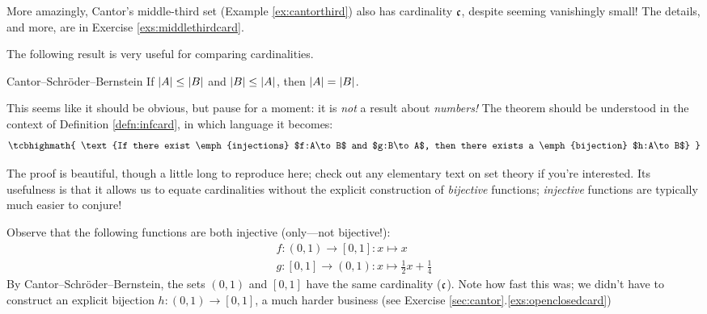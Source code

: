 More amazingly, Cantor's middle-third set (Example \ref{ex:cantorthird}) also has cardinality $\mathfrak{c}$, despite seeming vanishingly small! The details, and more, are in Exercise \ref{exs:middlethirdcard}.




The following result is very useful for comparing cardinalities. %

\begin{thm}{Cantor--Schröder--Bernstein}{}
	If $\left| A\right|\le\left| B\right|$ and $\left| B\right|\le\left| A\right|$, then $\left| A\right|=\left| B\right|$.
\end{thm}

This seems like it should be obvious, but pause for a moment: it is \emph{not} a result about \emph{numbers!} The theorem should be understood in the context of Definition \ref{defn:infcard}, in which language it becomes:
\[
\tcbhighmath{
\text{If there exist \emph{injections} $f:A\to B$ and $g:B\to A$, then there exists a \emph{bijection} $h:A\to B$}
}
\]

The proof is beautiful, though a little long to reproduce here; check out any elementary text on set theory if you're interested. Its usefulness is that it allows us to equate cardinalities without the explicit construction of \emph{bijective} functions; \emph{injective} functions are typically much easier to conjure!


\begin{example}{}{}
	Observe that the following functions are both injective (only---not bijective!):
	\begin{gather*}
		f:(0,1)\to[0,1]:x\mapsto x \tag{$\range(f)=(0,1)\subsetneq[0,1]$}\\
		g:[0,1]\to (0,1):x\mapsto \frac 12x+\frac 14 \tag{$\range(g)=[\tfrac 14,\tfrac 34]\subsetneq(0,1)$}
	\end{gather*}
	By Cantor--Schröder--Bernstein, the sets $(0,1)$ and $[0,1]$ have the same cardinality ($\mathfrak{c}$). Note how fast this was; we didn't have to construct an explicit bijection $h:(0,1)\to[0,1]$, a much harder business (see Exercise \ref*{sec:cantor}.\ref{exs:openclosedcard})
\end{example}


